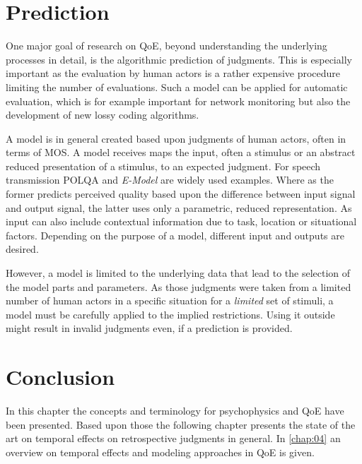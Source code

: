 \section{Prediction}
One major goal of research on \ac{QoE}, beyond understanding the underlying processes in detail, is the algorithmic prediction of judgments.
This is especially important as the evaluation by human actors is a rather expensive procedure limiting the number of evaluations.
Such a model can be applied for automatic evaluation, which is for example important for network monitoring but also the development of new lossy coding algorithms.

A model is in general created based upon judgments of human actors, often in terms of \ac{MOS}.
A model receives maps the input, often a stimulus or an abstract reduced presentation of a stimulus, to an expected judgment.
For speech transmission \ac{POLQA} \citep{itu-t_p.863:_2014} and \emph{E-Model} \citep{itu-t_g.107:_2014} are widely used examples.
Where as the former predicts perceived quality based upon the difference between input signal and output signal, the latter uses only a parametric, reduced representation.
As input can also include contextual information due to task, location or situational factors.
Depending on the purpose of a model, different input and outputs are desired.

However, a model is limited to the underlying data that lead to the selection of the model parts and parameters.
As those judgments were taken from a limited number of human actors in a specific situation for a \emph{limited} set of stimuli, a model must be carefully applied to the implied restrictions.
Using it outside might result in invalid judgments even, if a prediction is provided.

\section{Conclusion}
In this chapter the concepts and terminology for psychophysics and \ac{QoE} have been presented.
Based upon those the following chapter presents the state of the art on temporal effects on retrospective judgments in general.
In \autoref{chap:04} an overview on temporal effects and modeling approaches in \ac{QoE} is given.